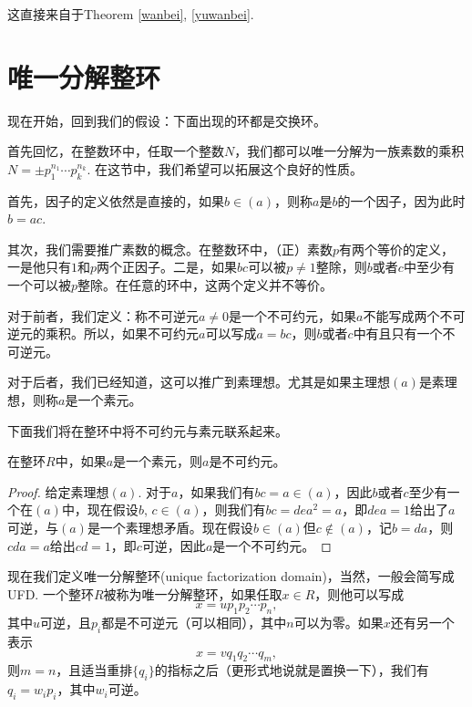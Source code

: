 这直接来自于Theorem \ref{wanbei}, \ref{yuwanbei}.

\section{唯一分解整环}

现在开始，回到我们的假设：下面出现的环都是交换环。

\begin{para}
首先回忆，在整数环中，任取一个整数$N$，我们都可以唯一分解为一族素数的乘积$N=\pm p_1^{n_1}\cdots p_k^{n_k}$. 在这节中，我们希望可以拓展这个良好的性质。

首先，因子的定义依然是直接的，如果$b\in (a)$，则称$a$是$b$的一个因子，因为此时$b=ac$.

其次，我们需要推广素数的概念。在整数环中，（正）素数$p$有两个等价的定义，一是他只有$1$和$p$两个正因子。二是，如果$bc$可以被$p\neq 1$整除，则$b$或者$c$中至少有一个可以被$p$整除。在任意的环中，这两个定义并不等价。

对于前者，我们定义：称不可逆元$a\neq 0$是一个不可约元，如果$a$不能写成两个不可逆元的乘积。所以，如果不可约元$a$可以写成$a=bc$，则$b$或者$c$中有且只有一个不可逆元。

对于后者，我们已经知道，这可以推广到素理想。尤其是如果主理想$(a)$是素理想，则称$a$是一个素元。
\end{para}

下面我们将在整环中将不可约元与素元联系起来。

\begin{lem}
在整环$R$中，如果$a$是一个素元，则$a$是不可约元。
\end{lem}

\begin{proof}
给定素理想$(a)$. 对于$a$，如果我们有$bc=a\in (a)$，因此$b$或者$c$至少有一个在$(a)$中，现在假设$b$, $c\in (a)$，则我们有$bc=dea^2=a$，即$dea=1$给出了$a$可逆，与$(a)$是一个素理想矛盾。现在假设$b\in (a)$但$c\not\in (a)$，记$b=da$，则$cda=a$给出$cd=1$，即$c$可逆，因此$a$是一个不可约元。
\end{proof}

\begin{para}
现在我们定义唯一分解整环(unique factorization domain)，当然，一般会简写成UFD. 一个整环$R$被称为唯一分解整环，如果任取$x\in R$，则他可以写成
\[
	x=up_1p_2\cdots p_n,
\]
其中$u$可逆，且$p_i$都是不可逆元（可以相同），其中$n$可以为零。如果$x$还有另一个表示
\[
	x=vq_1q_2\cdots q_m,
\]
则$m=n$，且适当重排$\{q_i\}$的指标之后（更形式地说就是置换一下），我们有$q_i=w_ip_i$，其中$w_i$可逆。
\end{para}

